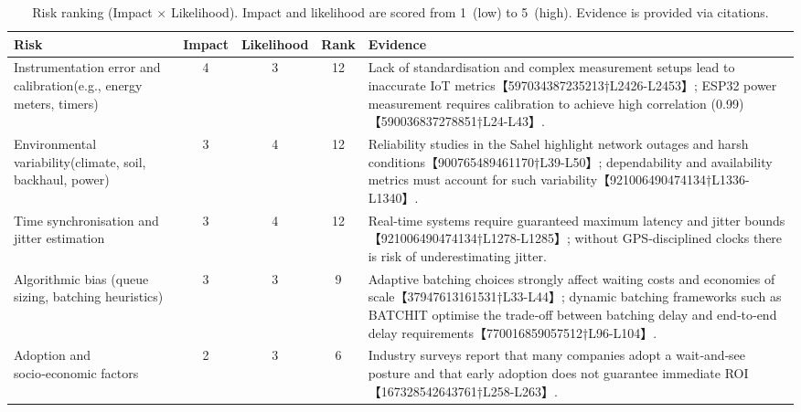 \documentclass[12pt,onecolumn]{IEEEtran} %
\begin{document}
\begin{table}[h]
  \centering
  \caption{Risk ranking (Impact \(\times\) Likelihood).  Impact and likelihood are scored from 1~(low) to 5~(high).  Evidence is provided via citations.}
  \label{tab:risk-table}
  \begin{tabular}{p{4cm}cccp{5cm}}
    \toprule
    \textbf{Risk} & \textbf{Impact} & \textbf{Likelihood} & \textbf{Rank} & \textbf{Evidence} \\
    \midrule
    Instrumentation error and calibration\newline (e.g., energy meters, timers) & 4 & 3 & 12 & Lack of standardisation and complex measurement setups lead to inaccurate IoT metrics【597034387235213†L2426-L2453】; ESP32 power measurement requires calibration to achieve high correlation (0.99)【590036837278851†L24-L43】. \\
    Environmental variability\newline (climate, soil, backhaul, power) & 3 & 4 & 12 & Reliability studies in the Sahel highlight network outages and harsh conditions【900765489461170†L39-L50】; dependability and availability metrics must account for such variability【921006490474134†L1336-L1340】. \\
    Time synchronisation and jitter estimation & 3 & 4 & 12 & Real‑time systems require guaranteed maximum latency and jitter bounds【921006490474134†L1278-L1285】; without GPS‑disciplined clocks there is risk of underestimating jitter. \\
    Algorithmic bias (queue sizing, batching heuristics) & 3 & 3 & 9 & Adaptive batching choices strongly affect waiting costs and economies of scale【37947613161531†L33-L44】; dynamic batching frameworks such as BATCHIT optimise the trade‑off between batching delay and end‑to‑end delay requirements【770016859057512†L96-L104】. \\
    Adoption and socio‑economic factors & 2 & 3 & 6 & Industry surveys report that many companies adopt a wait‑and‑see posture and that early adoption does not guarantee immediate ROI【167328542643761†L258-L263】. \\
    \bottomrule
  \end{tabular}
\end{table}
\end{document}
